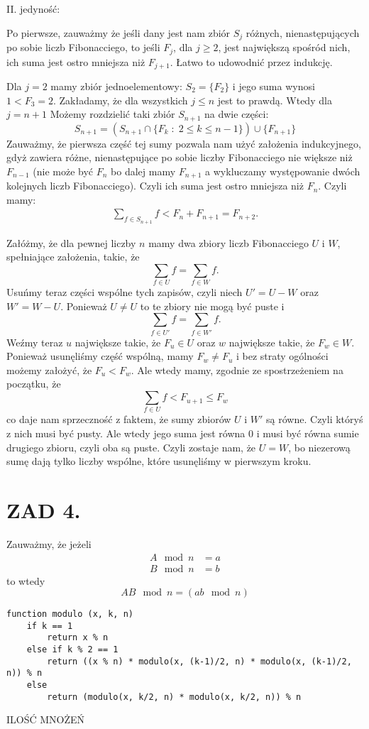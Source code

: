\documentclass{article}[13pt]
\begin{document}
    II. jedyność:
    \medskip

    Po pierwsze, zauważmy że jeśli dany jest nam zbiór $S_j$ różnych, nienastępujących po sobie liczb Fibonacciego, to jeśli $F_j$, dla $j\geq 2$, jest największą spośród nich, ich suma jest ostro mniejsza niż $F_{j+1}$. Łatwo to udowodnić przez indukcję.
    \smallskip
    
    Dla $j=2$ mamy zbiór jednoelementowy: $S_2=\{F_2\}$ i jego suma wynosi $1<F_3=2$. Zakładamy, że dla wszystkich $j\leq n$ jest to prawdą. Wtedy dla $j=n+1$ Możemy rozdzielić taki zbiór $S_{n+1}$ na dwie części:
    $$S_{n+1}=(S_{n+1}\cap\{F_k\;:\;2\leq k\leq n-1\})\cup\{F_{n+1}\}$$
    Zauważmy, że pierwsza część tej sumy pozwala nam użyć założenia indukcyjnego, gdyż zawiera różne, nienastępujące po sobie liczby Fibonacciego nie większe niż $F_{n-1}$ (nie może być $F_n$ bo dalej mamy $F_{n+1}$ a wykluczamy występowanie dwóch kolejnych liczb Fibonacciego). Czyli ich suma jest ostro mniejsza niż $F_{n}$. Czyli mamy:
    \begin{align*}
        \sum\limits_{f\in S_{n+1}}f<F_n+F_{n+1}=F_{n+2}.
    \end{align*}

    Załóżmy, że dla pewnej liczby $n$ mamy dwa zbiory liczb Fibonacciego $U$ i $W$, spełniające założenia, takie, że
    $$\sum\limits_{f\in U}f=\sum\limits_{f\in W}f.$$
    Usuńmy teraz części wspólne tych zapisów, czyli niech $U'=U-W$ oraz $W'=W-U$. Ponieważ $U\neq U$ to te zbiory nie mogą być puste i 
    $$\sum\limits_{f\in U'}f=\sum\limits_{f\in W'}f.$$
    Weźmy teraz $u$ największe takie, że $F_u\in U$ oraz $w$ największe takie, że $F_w\in W$. Ponieważ usunęliśmy część wspólną, mamy $F_w\neq F_u$ i bez straty ogólności możemy założyć, że $F_u<F_w$. Ale wtedy mamy, zgodnie ze spostrzeżeniem na początku, że
    $$\sum\limits_{f\in U}f<F_{u+1}\leq F_w$$
    co daje nam sprzeczność z faktem, że sumy zbiorów $U$ i $W'$ są równe. Czyli któryś z nich musi być pusty. Ale wtedy jego suma jest równa 0 i musi być równa sumie drugiego zbioru, czyli oba są puste. Czyli zostaje nam, że $U=W$, bo niezerową sumę dają tylko liczby wspólne, które usunęliśmy w pierwszym kroku.

    
    \section*{ZAD 4.}

    Zauważmy, że jeżeli
    \begin{align*}
        A\mod n&=a\\
        B\mod n&=b
    \end{align*}
    to wtedy
    $$AB\mod n=(ab\mod n)$$

\begin{lstlisting}[language=juleczka]
function modulo (x, k, n)
    if k == 1
        return x % n
    else if k % 2 == 1
        return ((x % n) * modulo(x, (k-1)/2, n) * modulo(x, (k-1)/2, n)) % n
    else
        return (modulo(x, k/2, n) * modulo(x, k/2, n)) % n
\end{lstlisting}

{\color{acc}ILOŚĆ MNOŻEŃ}
\end{document}

